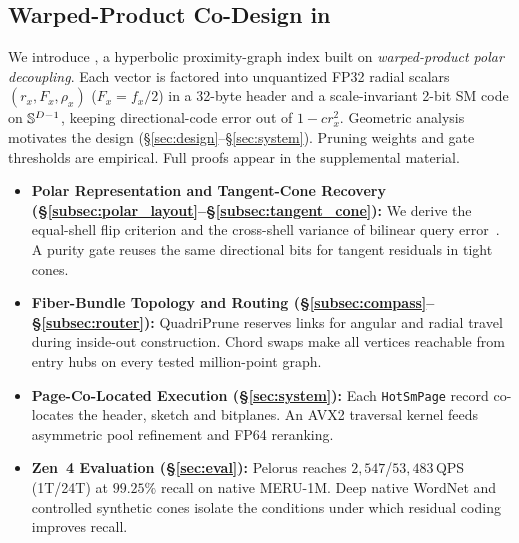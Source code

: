 \subsection{Warped-Product Co-Design in \rquiver{}}
\label{subsec:intro_solution}


We introduce \textbf{\rquiver{}}, a hyperbolic proximity-graph index built on \emph{warped-product polar decoupling}.
Each vector is factored into unquantized FP32 radial scalars $(r_x, F_x, \rho_x)$ ($F_x = f_x/2$) in a 32-byte header and a scale-invariant 2-bit {SM} code on $\mathbb{S}^{D-1}$, keeping directional-code error out of $1 - c r_x^2$.
Geometric analysis motivates the design (\S\ref{sec:design}--\S\ref{sec:system}). Pruning weights and gate thresholds are empirical. Full proofs appear in the supplemental material.
\begin{itemize}
  \item \textbf{Polar Representation and Tangent-Cone Recovery (\S\ref{subsec:polar_layout}--\S\ref{subsec:tangent_cone}):}
  We derive the equal-shell flip criterion and the cross-shell variance of bilinear query error~\cite{xiao2026decisions}. A purity gate reuses the same directional bits for tangent residuals in tight cones.

  \item \textbf{Fiber-Bundle Topology and Routing (\S\ref{subsec:compass}--\S\ref{subsec:router}):}
  QuadriPrune reserves links for angular and radial travel during inside-out construction. Chord swaps make all vertices reachable from entry hubs on every tested million-point graph.

  \item \textbf{Page-Co-Located Execution (\S\ref{sec:system}):}
  Each \texttt{HotSmPage} record co-locates the header, sketch and bitplanes. An AVX2 traversal kernel feeds asymmetric pool refinement and FP64 reranking.

  \item \textbf{Zen~4 Evaluation (\S\ref{sec:eval}):}
  Pelorus reaches $2{,}547$/$53{,}483$\,QPS (1T/24T) at $99.25\%$ recall on native {MERU-1M}. Deep native {WordNet} and controlled synthetic cones isolate the conditions under which residual coding improves recall.
\end{itemize}
